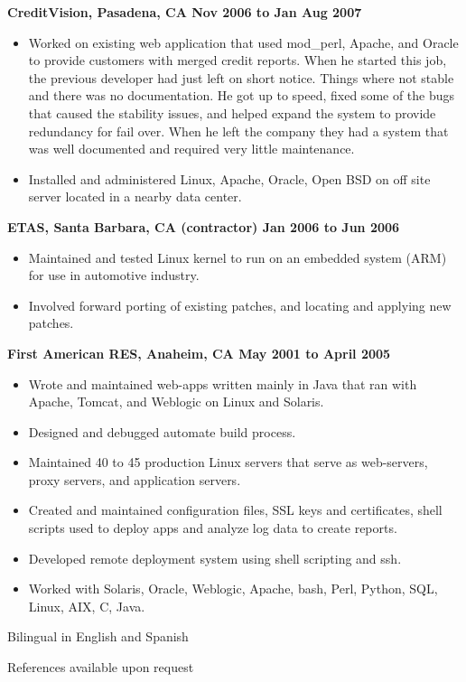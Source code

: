 \documentclass{res}
\begin{document}
\begin{resume}
\begin{itemize}
\end{itemize}

{\large \bf CreditVision, Pasadena, CA \hfill Nov 2006 to Jan Aug 2007}
\begin{itemize}

\item Worked on existing web application that used mod\_perl, Apache,
and Oracle to provide customers with merged credit reports.  When he
started this job, the previous developer had just left on short notice.
Things where not stable and there was no documentation.  He got up to
speed, fixed some of the bugs that caused the stability issues, and
helped expand the system to provide redundancy for fail over.  When he
left the company they had a system that was well documented and required
very little maintenance.

\item Installed and administered Linux, Apache, Oracle, Open BSD on off
site server located in a nearby data center.

\end{itemize}

{\large \bf ETAS, Santa Barbara, CA (contractor) \hfill Jan 2006 to Jun 2006}
\begin{itemize}

\item Maintained and tested Linux kernel to run on an embedded system
(ARM) for use in automotive industry.

\item Involved forward porting of existing patches, and locating and
applying new patches.

\end{itemize}


{\large \bf First American RES, Anaheim, CA \hfill May 2001 to April 2005}
\begin{itemize}

\item Wrote and maintained web-apps written mainly in Java that ran with
Apache, Tomcat, and Weblogic on Linux and Solaris.

\item Designed and debugged automate build process.

\item Maintained 40 to 45 production Linux servers that serve as
web-servers, proxy servers, and application servers.

\item Created and maintained configuration files, SSL keys and
certificates, shell scripts used to deploy apps and analyze log data to
create reports.

\item Developed remote deployment system using shell scripting and ssh.

\item  Worked with Solaris, Oracle, Weblogic, Apache, bash, Perl,
Python, SQL, Linux, AIX, C, Java.

\end{itemize}


Bilingual in English and Spanish

References available upon request

\end{resume}
\end{document}
